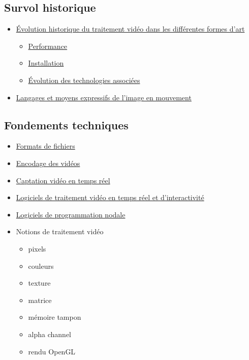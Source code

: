 \documentclass[
  french,
]{book}
\providecommand{\tightlist}{%
  \setlength{\itemsep}{0pt}\setlength{\parskip}{0pt}}
\begin{document}
\hypertarget{survol-historique}{%
\subsection{Survol historique}\label{survol-historique}}

\begin{itemize}
\tightlist
\item
  \protect\hyperlink{evolution_historique}{Évolution historique du traitement vidéo dans les différentes formes d'art}

  \begin{itemize}
  \tightlist
  \item
    \protect\hyperlink{evolution_historique_performance}{Performance}
  \item
    \protect\hyperlink{evolution_historique_installation}{Installation}
  \item
    \protect\hyperlink{evolution_historique_technologies}{Évolution des technologies associées}
  \end{itemize}
\item
  \protect\hyperlink{evolution_historique_language}{Langages et moyens expressifs de l'image en mouvement}
\end{itemize}

\hypertarget{fondements-techniques}{%
\subsection{Fondements techniques}\label{fondements-techniques}}

\begin{itemize}
\tightlist
\item
  \protect\hyperlink{lexique_fichiers}{Formats de fichiers}
\item
  \protect\hyperlink{lexique_encodage}{Encodage des vidéos}\\
\item
  \protect\hyperlink{aquerir_captation}{Captation vidéo en temps réel}
\item
  \protect\hyperlink{traiter_logiciels}{Logiciels de traitement vidéo en temps réel et d'interactivité}
\item
  \protect\hyperlink{programmer_logiciels}{Logiciels de programmation nodale}
\item
  Notions de traitement vidéo

  \begin{itemize}
  \tightlist
  \item
    pixels
  \item
    couleurs
  \item
    texture
  \item
    matrice
  \item
    mémoire tampon
  \item
    alpha channel
  \item
    rendu OpenGL
  \end{itemize}
\end{itemize}
\end{document}
